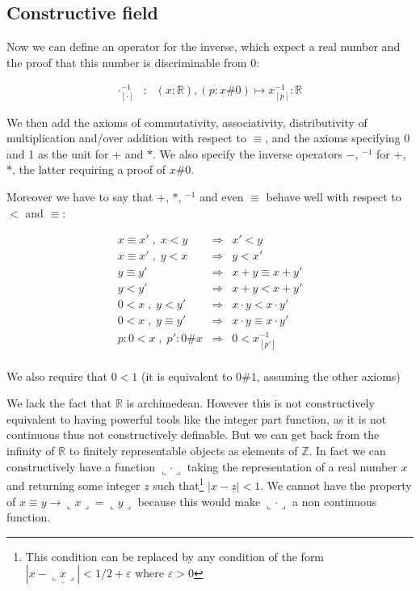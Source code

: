 \documentclass[a4paper,11pt]{article}
\newcommand{\R}{\mathbb{R}}
\newcommand{\Z}{\mathbb{Z}}
\theoremstyle{definition}
\theoremstyle{remark}
\begin{document}
\subsection{Constructive field}

Now we can define an operator for the inverse, which expect a real number and the
proof that this number is discriminable from 0:

  \[
  \begin{array}{ccl}
  \cdot^{-1}_{[\cdot]} & : & (x:\R), (p:x\#0) \mapsto x^{-1}_{[p]} : \R
  \end{array}
  \]

We then add the axioms of commutativity, associativity, distributivity of multiplication and/over
addition with respect to $≡$, and the axioms specifying 0 and 1 as the unit for $+$ and $*$. We also specify the inverse operators $-$, $^{-1}$ for $+$, $*$, the latter requiring a proof of $x\#0$.

Moreover we have to say that $+$, $*$, $^{-1}$ and even $≡$ behave well with respect to $<$ and $≡$:

  \[
  \begin{array}{rcl}
  x ≡ x' \;,\; x < y   &  \Rightarrow  & x' < y \\
  x ≡ x' \;,\; y < x   &  \Rightarrow  & y < x' \\
  y ≡ y'               &  \Rightarrow  & x + y ≡ x + y' \\
  y < y'                    &  \Rightarrow  & x + y < x + y' \\
  0 < x \;,\; y < y'        &  \Rightarrow  & x \cdot y < x \cdot y' \\
  0 < x \;,\; y ≡ y'   &  \Rightarrow  & x \cdot y ≡ x \cdot y' \\
  p:0<x \;,\;  p':0\#x      &  \Rightarrow  & 0 < x^{-1}_{[p']} \\
  \end{array}
  \]

We also require that $0<1$ (it is equivalent to $0\#1$, assuming the other axioms)

We lack the fact that $\R$ is archimedean. However this is not constructively equivalent to having powerful tools like the integer part function, as it is not continuous thus not constructively definable. But we can get back from the infinity of $\R$ to finitely representable objects as elements of $\Z$. In fact we can constructively have a function $\llcorner \cdot \lrcorner$ taking the representation of a real number $x$ and returning some integer $z$ such that\footnote{This condition can be replaced by any condition of the form $| x-\underline {\llcorner x \lrcorner} | < 1/2+\varepsilon$ where $\varepsilon>0$} $| x-\underline z | < 1$. We cannot have the property of $x≡y → \llcorner x \lrcorner=\llcorner y \lrcorner$ because this would make $\llcorner \cdot \lrcorner$ a non continuous function.
\end{document}
